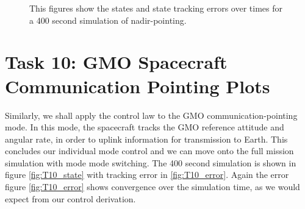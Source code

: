 \documentclass[paper]{aiaaNew}
\begin{document}
\begin{figure}[!htbp] 
\centering     %
{}
\caption{This figures show the states and state tracking errors over times for a 400 second simulation of nadir-pointing.}
\end{figure}










\section*{Task 10: GMO Spacecraft Communication Pointing Plots}
Similarly, we shall apply the control law to the GMO communication-pointing mode. In this mode, the spacecraft tracks the GMO reference attitude and angular rate, in order to uplink information for transmission to Earth. This concludes our individual mode control and we can move onto the full mission simulation with mode mode switching. The 400 second simulation is shown in figure \ref{fig:T10_state} with tracking error in \ref{fig:T10_error}. Again the error figure \ref{fig:T10_error} shows convergence over the simulation time, as we would expect from our control derivation.
\end{document}
